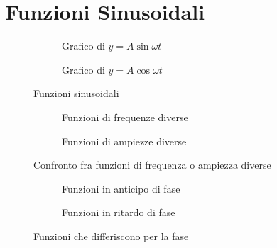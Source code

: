 \chapter{Funzioni Sinusoidali}
\label{sec:FunzioniSinusoidali}
\begin{figure}
	\begin{subfigure}[b]{.5\linewidth}
		\centering
		\caption{Grafico di $y=A\sin\omega t$}\label{fig:asinomegat}
	\end{subfigure}%
	\qquad\qquad
	\begin{subfigure}[b]{.5\linewidth}
		\centering
		\caption{Grafico di $y=A\cos\omega t$}\label{fig:acosomegat}
	\end{subfigure}
	\caption{Funzioni sinusoidali}
	\label{fig:Funzionisinusoidali}
\end{figure}
\begin{figure}
	\begin{subfigure}[b]{.5\linewidth}
		\centering
		\caption{Funzioni di frequenze diverse}\label{fig:frequenzediverse}
	\end{subfigure}%
		\qquad\qquad
	\begin{subfigure}[b]{.5\linewidth}
		\centering
		\caption{Funzioni di ampiezze diverse}\label{fig:ampiezzediverse}
	\end{subfigure}
	\caption{Confronto fra funzioni di frequenza o ampiezza diverse}
	\label{fig:ampiezzediversefrequenzediverse}
\end{figure}
\begin{figure}
	\begin{subfigure}[b]{.5\linewidth}
		\centering
		\caption{Funzioni in anticipo di fase}\label{fig:AsinomegaTSfasamentoAnticipato}
	\end{subfigure}%
		\qquad\qquad
	\begin{subfigure}[b]{.5\linewidth}
		\centering
		\caption{Funzioni in ritardo di fase}\label{fig:AsinomegaTSfasamentoRitardato}
	\end{subfigure}
	\caption{Funzioni che differiscono per la fase}%
	\label{fig:Funzionichedifferisconoperlafase}%
\end{figure}
